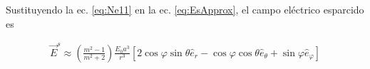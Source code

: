 \documentclass[letterpaper, 12pt] {article}
\begin{document}
Sustituyendo la ec. \eqref{eq:Ne11} en la ec. \eqref{eq:EsApprox}, el campo eléctrico esparcido es

\begin{align}
\vec{E}^s \approx  \left(\frac{m^2-1}{m^2+2} \right)\frac{E_0 a^3}{r^3}
	\left[ 2 \cos\varphi \sin\theta \hat{e}_r 
- \cos\varphi \cos\theta \hat{e}_\theta + \sin\varphi \hat{e}_\varphi \right]
\end{align}
\end{document}

